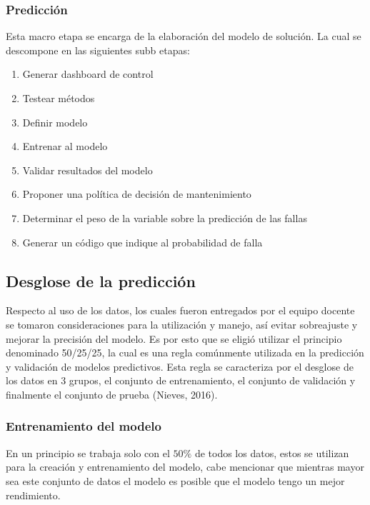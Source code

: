 \documentclass[10pt]{article}
\begin{document}
\subsubsection{Predicción}
Esta macro etapa se encarga de la elaboración del modelo de solución. La cual se descompone en las siguientes subb etapas:
\begin{enumerate}
\item Generar dashboard de control
\item Testear métodos 
\item Definir modelo 
\item Entrenar al modelo
\item Validar resultados del modelo
\item Proponer una política de decisión de mantenimiento
\item Determinar el peso de la variable sobre la predicción de las fallas
\item Generar un código que indique al probabilidad de falla

\end{enumerate}

\subsection{Desglose de la predicción}

Respecto al uso de los datos, los cuales fueron entregados por el equipo docente se tomaron consideraciones para la utilización y manejo, así evitar sobreajuste y mejorar la precisión del modelo. Es por esto que se eligió utilizar el principio denominado 50/25/25, la cual es una regla comúnmente utilizada en la predicción y validación de modelos predictivos. Esta regla se caracteriza por el desglose de los datos en 3 grupos, el conjunto de entrenamiento, el conjunto de validación y finalmente el conjunto de prueba (Nieves, 2016).
\subsubsection{Entrenamiento del modelo}

En un principio se trabaja solo con el $50\%$ de todos los datos, estos se utilizan para la creación y entrenamiento del modelo, cabe mencionar que mientras mayor sea este conjunto de datos el modelo es posible que el modelo tengo un mejor rendimiento. 
\end{document}
